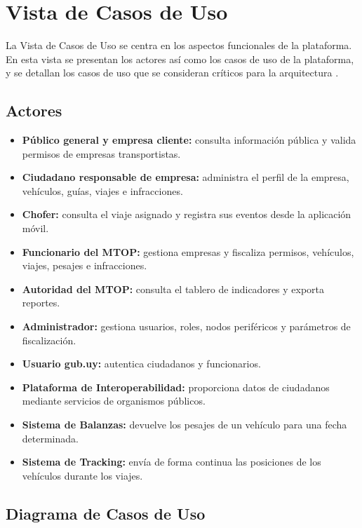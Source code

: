 \section{Vista de Casos de Uso}\label{sec:vista-casos-de-uso}

La Vista de Casos de Uso se centra en los aspectos funcionales de la plataforma. En esta vista se presentan los actores así como los casos de uso de la plataforma, y se detallan los casos de uso que se consideran críticos para la arquitectura \cite{LINS2026}.

\subsection{Actores}

\begin{itemize}
    \item \textbf{Público general y empresa cliente:} consulta información pública y valida permisos de empresas transportistas.
    \item \textbf{Ciudadano responsable de empresa:} administra el perfil de la empresa, vehículos, guías, viajes e infracciones.
    \item \textbf{Chofer:} consulta el viaje asignado y registra sus eventos desde la aplicación móvil.
    \item \textbf{Funcionario del MTOP:} gestiona empresas y fiscaliza permisos, vehículos, viajes, pesajes e infracciones.
    \item \textbf{Autoridad del MTOP:} consulta el tablero de indicadores y exporta reportes.
    \item \textbf{Administrador:} gestiona usuarios, roles, nodos periféricos y parámetros de fiscalización.
    \item \textbf{Usuario gub.uy:} autentica ciudadanos y funcionarios.
    \item \textbf{Plataforma de Interoperabilidad:} proporciona datos de ciudadanos mediante servicios de organismos públicos.
    \item \textbf{Sistema de Balanzas:} devuelve los pesajes de un vehículo para una fecha determinada.
    \item \textbf{Sistema de Tracking:} envía de forma continua las posiciones de los vehículos durante los viajes.
\end{itemize}

\subsection{Diagrama de Casos de Uso}

